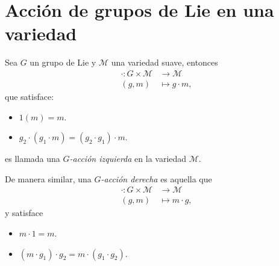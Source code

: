
\section{Acci\'{o}n de grupos de Lie en una variedad}

\begin{mydef}  \cite{Kobayashi}
Sea $G$ un grupo de Lie y $\mathcal{M}$ una variedad suave, entonces
%
\begin{align*}
\cdot: G \times \mathcal{M} & \longrightarrow \mathcal{M} \\
(g, m) & \longmapsto g \cdot m,
\end{align*}
%
que satisface:
%
\begin{itemize}
\item{$1 (m) = m$.}
\item{$g_{2} \cdot (g_{1} \cdot m) = (g_{2} \cdot g_{1}) \cdot m$.}
\end{itemize}
es llamada una \emph{$G$-acci\'{o}n izquierda} en la variedad $\mathcal{M}$.
%
\end{mydef}

\begin{mydef}  \cite{Kobayashi}
De manera similar, una \emph{$G$-acci\'{o}n derecha} es aquella que
\begin{align*}
\cdot: G \times \mathcal{M} & \longrightarrow \mathcal{M}\\
(g, m) & \longmapsto m \cdot g,
\end{align*}
%
y satisface
%
\begin{itemize}
\item{$m \cdot 1 = m$.}
\item{$(m \cdot g_{1}) \cdot g_{2}= m \cdot (g_{1} \cdot g_{2})$.}
\end{itemize}
%
\end{mydef}

